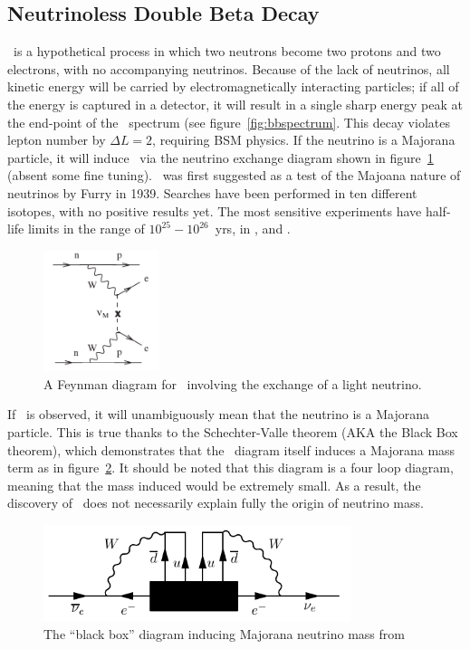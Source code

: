 \documentclass[/main.tex]{subfiles}
\begin{document}
\subsection{Neutrinoless Double Beta Decay}
\znbb\ is a hypothetical process in which two neutrons become two protons and two electrons, with no accompanying neutrinos.
Because of the lack of neutrinos, all kinetic energy will be carried by electromagnetically interacting particles; if all of the energy is captured in a detector, it will result in a single sharp energy peak at the end-point of the \tnbb\ spectrum (see figure~\ref{fig:bbspectrum}.
This decay violates lepton number by $\Delta L=2$, requiring BSM physics.
If the neutrino is a Majorana particle, it will induce \znbb\ via the neutrino exchange diagram shown in figure~\ref{fig:bbdiagram} (absent some fine tuning).
\znbb\ was first suggested as a test of the Majoana nature of neutrinos by Furry in 1939\cite{Furry1939}.
Searches have been performed in ten different isotopes, with no positive results yet.
The most sensitive experiments have half-life limits in the range of $10^{25}-10^{26}$~yrs, in \cite{kamlandzen}, \cite{gerda2018} and \cite{Cuore2018}.
\begin{figure}[t]
  \centering
  \includegraphics[width=0.3\textwidth]{znbbDiagramLNE}
  \caption[\znbb\ Decay Diagram]{\label{fig:bbdiagram}
    A Feynman diagram for \znbb\ involving the exchange of a light neutrino.
  }
\end{figure}

If \znbb\ is observed, it will unambiguously mean that the neutrino is a Majorana particle.
This is true thanks to the Schechter-Valle theorem (AKA the Black Box theorem), which demonstrates that the \znbb\ diagram itself induces a Majorana mass term as in figure~\ref{fig:blackbox}\cite{Schechter1982}.
It should be noted that this diagram is a four loop diagram, meaning that the mass induced would be extremely small.
As a result, the discovery of \znbb\ does not necessarily explain fully the origin of neutrino mass.
\begin{figure}[t]
  \centering
  \includegraphics[width=0.8\textwidth]{blackboxdiagram}
  \caption[\znbb\ Decay Diagram]{\label{fig:blackbox}
    The ``black box'' diagram inducing Majorana neutrino mass from \znbb
  }
\end{figure}
\end{document}
